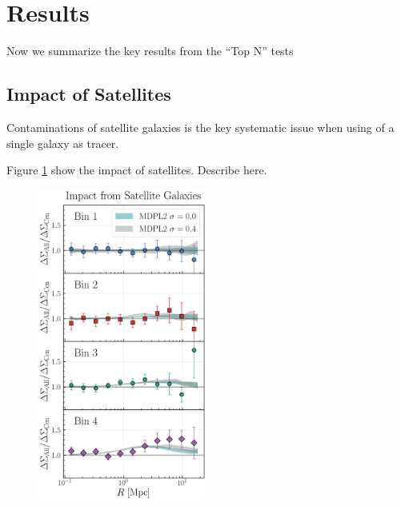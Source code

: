 \documentclass[a4paper,fleqn,usenatbib]{mnras}
\begin{document}
\section{Results}
    \label{sec:result}

  Now we summarize the key results from the ``Top N'' tests

\subsection{Impact of Satellites}
    \label{sec:satellite}

    Contaminations of satellite galaxies is the key systematic issue when using \mstar{} of 
    a single galaxy as \mvir{} tracer.

Figure \ref{fig:satellite} show the impact of satellites. Describe here.

  \begin{figure}
      \centering 
      \includegraphics[width=0.49\textwidth]{figure/dsigma_sat_ratio}
      \caption{
          }
      \label{fig:satellite}
  \end{figure}
\end{document}
